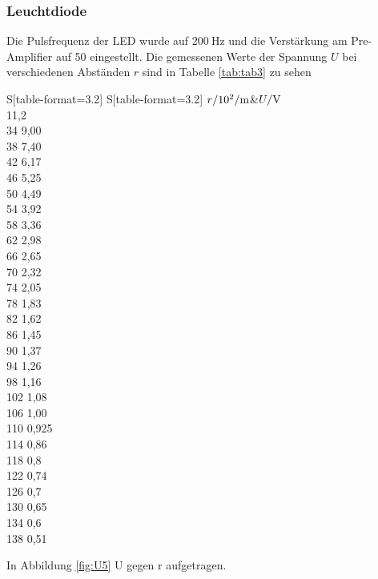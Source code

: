 \subsubsection{Leuchtdiode}
Die Pulsfrequenz der LED wurde auf $\SI{200}{\hertz}$ und die Verstärkung am Pre-Amplifier auf 50 eingestellt. Die gemessenen Werte der Spannung $U$ bei verschiedenen Abständen $r$ sind in Tabelle \ref{tab:tab3} zu sehen
\begin{table}
	\centering
	\caption{Messwerte der Ausgangsspannung $U_.{out}$ nach dem Tiefpassfilter mit Noise-Schaltung}
	\begin{tabular}{S[table-format=3.2] S[table-format=3.2]}
		\toprule
		{$r/10^2/\si[per-mode=reciprocal]{\metre}$}&{$U/\si[per-mode=reciprocal]{\volt}$} \\
		 11,2 \\
		34 9,00 \\
		38 7,40 \\
		42 6,17 \\
		46 5,25 \\
		50 4,49 \\
		54 3,92 \\
		58 3,36 \\
		62 2,98 \\
		66 2,65 \\
		70 2,32 \\
		74 2,05 \\
		78 1,83 \\
		82 1,62 \\
		86 1,45 \\
		90 1,37 \\
		94 1,26 \\
		98 1,16 \\
		102 1,08 \\
		106 1,00 \\
		110 0,925 \\
		114 0,86 \\
		118 0,8 \\
		122 0,74 \\
		126 0,7 \\
		130 0,65 \\
		134 0,6 \\
		138 0,51 \\
		\bottomrule
	\end{tabular}
	\label{tab:tab3}
\end{table}
In Abbildung \ref{fig:U5} U gegen r aufgetragen.
